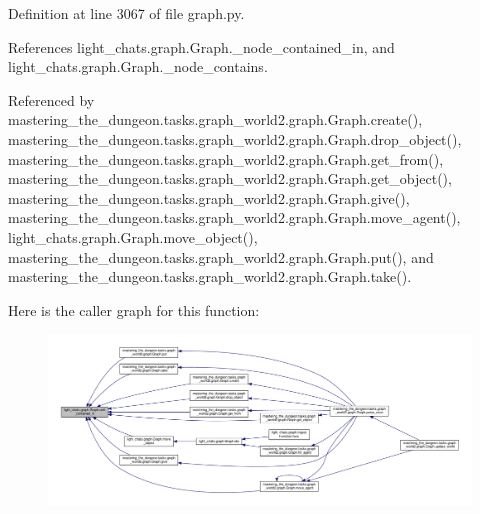 Definition at line 3067 of file graph.\+py.



References light\+\_\+chats.\+graph.\+Graph.\+\_\+node\+\_\+contained\+\_\+in, and light\+\_\+chats.\+graph.\+Graph.\+\_\+node\+\_\+contains.



Referenced by mastering\+\_\+the\+\_\+dungeon.\+tasks.\+graph\+\_\+world2.\+graph.\+Graph.\+create(), mastering\+\_\+the\+\_\+dungeon.\+tasks.\+graph\+\_\+world2.\+graph.\+Graph.\+drop\+\_\+object(), mastering\+\_\+the\+\_\+dungeon.\+tasks.\+graph\+\_\+world2.\+graph.\+Graph.\+get\+\_\+from(), mastering\+\_\+the\+\_\+dungeon.\+tasks.\+graph\+\_\+world2.\+graph.\+Graph.\+get\+\_\+object(), mastering\+\_\+the\+\_\+dungeon.\+tasks.\+graph\+\_\+world2.\+graph.\+Graph.\+give(), mastering\+\_\+the\+\_\+dungeon.\+tasks.\+graph\+\_\+world2.\+graph.\+Graph.\+move\+\_\+agent(), light\+\_\+chats.\+graph.\+Graph.\+move\+\_\+object(), mastering\+\_\+the\+\_\+dungeon.\+tasks.\+graph\+\_\+world2.\+graph.\+Graph.\+put(), and mastering\+\_\+the\+\_\+dungeon.\+tasks.\+graph\+\_\+world2.\+graph.\+Graph.\+take().

Here is the caller graph for this function\+:
\nopagebreak
\begin{figure}[H]
\begin{center}
\leavevmode
\includegraphics[width=350pt]{classlight__chats_1_1graph_1_1Graph_a764ec9d5d95e071d857644b1947a2385_icgraph}
\end{center}
\end{figure}
\mbox{\label{classlight__chats_1_1graph_1_1Graph_ab343f587ca9bf3b7576fbe93e537dbca}} 
